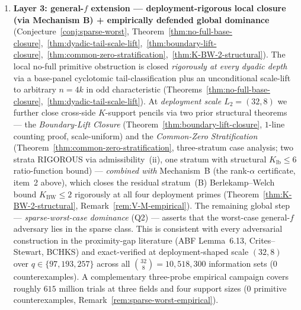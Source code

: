 \documentclass[11pt]{article}
\theoremstyle{definition}
\theoremstyle{remark}
\begin{document}
\begin{enumerate}[label=(\arabic*),leftmargin=1.5em]
\item \textbf{Layer 3: general-$f$ extension --- deployment-rigorous
local closure (via Mechanism B) + empirically defended global dominance}
(Conjecture~\ref{conj:sparse-worst},
Theorem~\ref{thm:no-full-base-closure},~\ref{thm:dyadic-tail-scale-lift},~\ref{thm:boundary-lift-closure},~\ref{thm:common-zero-stratification},~\ref{thm:K-BW-2-structural}).
The local no-full primitive obstruction is closed
\emph{rigorously at every dyadic depth} via a base-panel cyclotomic
tail-classification plus an unconditional scale-lift to arbitrary
$n = 4k$ in odd characteristic
(Theorems~\ref{thm:no-full-base-closure},~\ref{thm:dyadic-tail-scale-lift}).
At \emph{deployment scale $L_2 = (32, 8)$} we further close cross-side
$K$-support pencils via two prior structural theorems --- the
\emph{Boundary-Lift Closure} (Theorem~\ref{thm:boundary-lift-closure},
$1$-line counting proof, scale-uniform) and the \emph{Common-Zero
Stratification} (Theorem~\ref{thm:common-zero-stratification},
three-stratum case analysis; two strata RIGOROUS via admissibility~(ii),
one stratum with structural $K_{\mathrm{lb}} \leq 6$ ratio-function
bound) --- \emph{combined with} Mechanism~B (the rank-$\alpha$
certificate, item~2 above), which closes the residual stratum~(B)
Berlekamp--Welch bound $K_{\mathrm{BW}} \leq 2$ rigorously at all four
deployment primes (Theorem~\ref{thm:K-BW-2-structural},
Remark~\ref{rem:V-M-empirical}). The remaining global step ---
\emph{sparse-worst-case dominance} (Q2) --- asserts that the
worst-case general-$f$ adversary lies in the sparse class. This is
consistent with every adversarial construction in the proximity-gap
literature (ABF Lemma~6.13, Crites--Stewart, BCHKS) and
exact-verified at deployment-shaped scale $(32, 8)$ over
$q \in \{97, 193, 257\}$ across all $\binom{32}{8} = 10{,}518{,}300$
information sets ($0$ counterexamples). A complementary three-probe
empirical campaign covers roughly $615$ million trials at three fields
and four support sizes ($0$ primitive counterexamples,
Remark~\ref{rem:sparse-worst-empirical}).
\end{enumerate}
\end{document}
